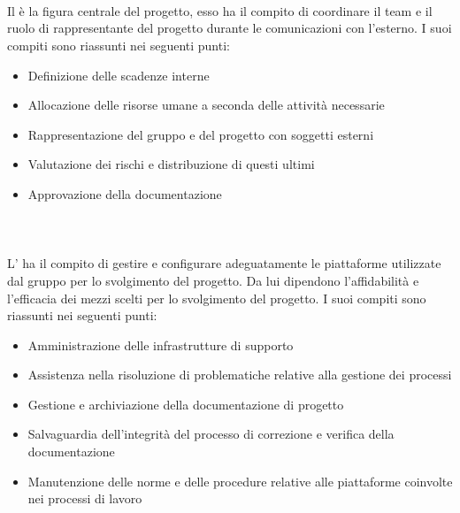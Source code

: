 \paragraph{\RdP{}}\mbox{}\\
\mbox{}\\
Il \RdP{} è la figura centrale del progetto, esso ha il compito di coordinare il team e il ruolo di rappresentante del progetto durante le comunicazioni con l'esterno. I suoi compiti sono riassunti nei seguenti punti:
\begin{itemize}
\item Definizione delle scadenze interne
\item Allocazione delle risorse umane a seconda delle attività necessarie
\item Rappresentazione del gruppo e del progetto con soggetti esterni
\item Valutazione dei rischi e distribuzione di questi ultimi
\item Approvazione della documentazione
\end{itemize}

\paragraph{\adm{}}\mbox{}\\
\mbox{}\\
L'\adm{} ha il compito di gestire e configurare adeguatamente le piattaforme utilizzate dal gruppo per lo svolgimento del progetto. Da lui dipendono l'affidabilità e l'efficacia dei mezzi scelti per lo svolgimento del progetto.
I suoi compiti sono riassunti nei seguenti punti:
\begin{itemize}
\item Amministrazione delle infrastrutture di supporto
\item Assistenza nella risoluzione di problematiche relative alla gestione dei processi
\item Gestione e archiviazione della documentazione di progetto
\item Salvaguardia dell'integrità del processo di correzione e verifica della documentazione
\item Manutenzione delle norme e delle procedure relative alle piattaforme coinvolte nei processi di lavoro
\end{itemize}

